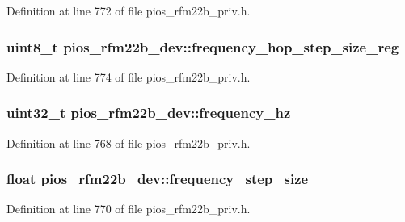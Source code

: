\-Definition at line 772 of file pios\-\_\-rfm22b\-\_\-priv.\-h.

\hypertarget{structpios__rfm22b__dev_a2ac3d7ab6d15ced50a36ffc03275b5ea}{
\subsubsection[{frequency\-\_\-hop\-\_\-step\-\_\-size\-\_\-reg}]{\setlength{\rightskip}{0pt plus 5cm}uint8\-\_\-t {\bf pios\-\_\-rfm22b\-\_\-dev\-::frequency\-\_\-hop\-\_\-step\-\_\-size\-\_\-reg}}}\label{structpios__rfm22b__dev_a2ac3d7ab6d15ced50a36ffc03275b5ea}


\-Definition at line 774 of file pios\-\_\-rfm22b\-\_\-priv.\-h.

\hypertarget{structpios__rfm22b__dev_a1b85d9c8c4c8dc7ebb1449ce2febee0e}{
\subsubsection[{frequency\-\_\-hz}]{\setlength{\rightskip}{0pt plus 5cm}uint32\-\_\-t {\bf pios\-\_\-rfm22b\-\_\-dev\-::frequency\-\_\-hz}}}\label{structpios__rfm22b__dev_a1b85d9c8c4c8dc7ebb1449ce2febee0e}


\-Definition at line 768 of file pios\-\_\-rfm22b\-\_\-priv.\-h.

\hypertarget{structpios__rfm22b__dev_a8cc9611e61bcaf29852b83cffa87ccd6}{
\subsubsection[{frequency\-\_\-step\-\_\-size}]{\setlength{\rightskip}{0pt plus 5cm}float {\bf pios\-\_\-rfm22b\-\_\-dev\-::frequency\-\_\-step\-\_\-size}}}\label{structpios__rfm22b__dev_a8cc9611e61bcaf29852b83cffa87ccd6}


\-Definition at line 770 of file pios\-\_\-rfm22b\-\_\-priv.\-h.

